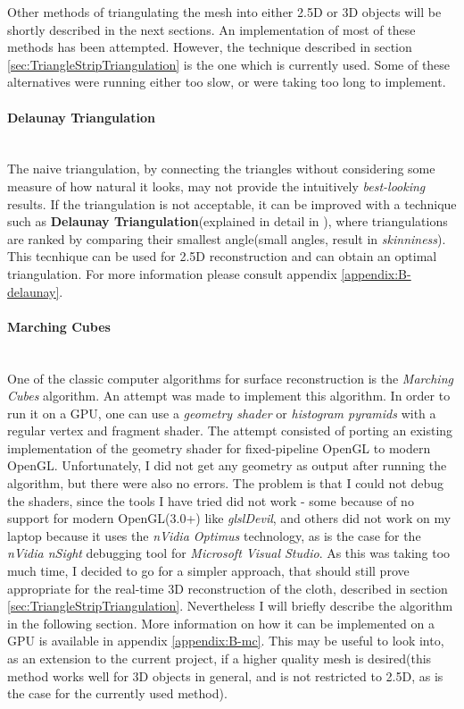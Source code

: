 \documentclass[]{article}
\begin{document}
Other methods of triangulating the mesh into either 2.5D or 3D objects will be shortly described in the next sections. An implementation of most of these methods has been attempted. However, the technique described in section \ref{sec:TriangleStripTriangulation} is the one which is currently used. Some of these alternatives were running either too slow, or were taking too long to implement.

\paragraph{Delaunay Triangulation}\mbox{}\\

The naive triangulation, by connecting the triangles without considering some measure of how natural it looks, may not provide the intuitively \textit{best-looking} results. If the triangulation is not acceptable, it can be improved with a technique such as \textbf{Delaunay Triangulation}(explained in detail in \cite[Chapter~9]{berg08}), where triangulations are ranked by comparing their smallest angle(small angles, result in \textit{skinniness}). This tecnhique can be used for 2.5D reconstruction and can obtain an optimal triangulation. For more information please consult appendix \ref{appendix:B-delaunay}.

\paragraph{Marching Cubes}\mbox{}\\

One of the classic computer algorithms for surface reconstruction is the \textit{Marching Cubes}  algorithm. An attempt was made to implement this algorithm. In order to run it on a GPU, one can use a \textit{geometry shader} or\textit{ histogram pyramids} with a regular vertex and fragment shader. The attempt consisted of porting an existing implementation of the geometry shader for fixed-pipeline OpenGL to modern OpenGL. Unfortunately, I did not get any geometry as output after running the algorithm, but there were also no errors. The problem is that I could not debug the shaders, since the tools I have tried did not work - some because of no support for modern OpenGL(3.0+) like \textit{glslDevil}, and others did not work on my laptop because it uses the \textit{nVidia Optimus} technology, as is the case for the \textit{nVidia nSight} debugging tool for \textit{Microsoft Visual Studio}. As this was taking too much time, I decided to go for a simpler approach, that should still prove appropriate for the real-time 3D reconstruction of the cloth, described in section \ref{sec:TriangleStripTriangulation}. Nevertheless I will briefly describe the algorithm in the following section. More information on how it can be implemented on a GPU is available in appendix \ref{appendix:B-mc}. This may be useful to look into, as an extension to the current project, if a higher quality mesh is desired(this method works well for 3D objects in general, and is not restricted to 2.5D, as is the case for the currently used method).
\end{document}
